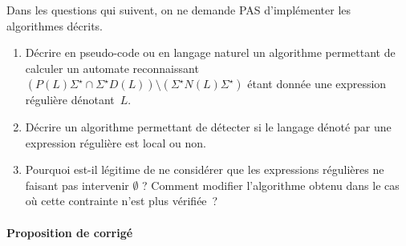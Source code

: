 \documentclass[a4paper, 11pt]{article}
\begin{document}
Dans les questions qui suivent, on ne demande PAS d'implémenter les algorithmes décrits.
\begin{enumerate}[resume]
    \item Décrire en pseudo-code ou en langage naturel un algorithme permettant de calculer un automate reconnaissant $(P(L)\Sigma^{\star} \cap \Sigma^{\star}D(L)) \setminus (\Sigma^{\star}N(L)\Sigma^{\star})$ étant donnée une expression régulière dénotant~$L$.
    \item Décrire un algorithme permettant de détecter si le langage dénoté par une expression régulière est local ou non.
    \item Pourquoi est-il légitime de ne considérer que les expressions régulières ne faisant pas intervenir $\emptyset$ ? Comment modifier l'algorithme obtenu dans le cas où cette contrainte n'est plus vérifiée~?
\end{enumerate}

\paragraph*{Proposition de corrigé}
\end{document}
